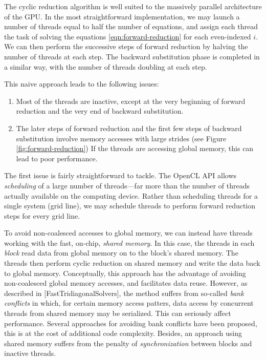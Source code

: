 \documentclass{article}
\begin{document}
        The cyclic reduction algorithm is well suited to the massively
        parallel architecture of the GPU.
        In the most straightforward implementation,
        we may launch a number of threads equal to
        half the number of equations,
        and assign each thread the task of
        solving the equations \ref{eqn:forward-reduction} for each even-indexed
        $i$.
        We can then perform the successive steps of forward reduction
        by halving the number of threads at each step.
        The backward substitution phase is completed in a similar way,
        with the number of threads doubling at each step.

        This naive approach leads to the following issues:

        \begin{enumerate}
            \item Most of the threads are inactive,
            except at the very beginning of forward reduction
            and the very end of backward substitution.

            \item The later steps of forward reduction and the first few
            steps of backward substitution involve memory accesses with
            large strides (see Figure \ref{fig:forward-reduction})
            If the threads are accessing global memory,
            this can lead to poor performance.
        \end{enumerate}

        The first issue is fairly straightforward to tackle.
        The OpenCL API allows \emph{scheduling} of a large number of
        threads---far more than the number of threads actually available
        on the computing device.
        Rather than scheduling threads for a single system (grid line),
        we may schedule threads to perform
        forward reduction steps for every grid line.

        To avoid non-coalesced accesses to global memory,
        we can instead have threads working with the fast, on-chip,
        \emph{shared memory}. In this case, the threads in each
        \emph{block} read data from global memory on to the block's
        shared memory.
        The threads then perform cyclic reduction on shared memory
        and write the data back to global memory.
        Conceptually, this approach has the advantage of avoiding
        non-coalesced global memory accesses, and facilitates data reuse.
        However, as described in [FastTridiagonalSolvers], the method
        suffers from so-called \emph{bank conflicts} in which,
        for certain memory access patters,
        data access by concurrent threads from shared memory may be serialized.
        This can seriously affect performance.
        Several approaches for avoiding bank conflicts have been proposed,
        this is at the cost of additional code complexity.
        Besides, an approach using shared memory suffers from the penalty
        of \emph{synchronization} between blocks and inactive threads.
\end{document}
